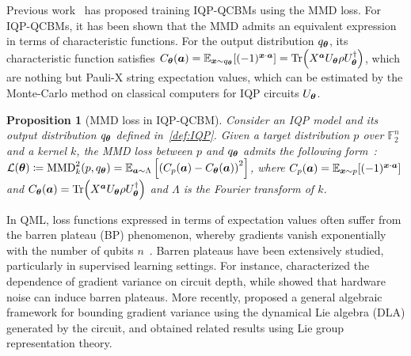 \documentclass{article}
\theoremstyle{plain}
\newtheorem{proposition}[theorem]{Proposition}
\theoremstyle{definition}
\theoremstyle{remark}
\begin{document}
Previous work~\citet{recioarmengol25} has proposed training IQP-QCBMs using the MMD loss. 
For IQP-QCBMs, it has been shown that the MMD admits an equivalent expression in terms of characteristic functions. For the output distribution $q_{\bm{\theta}}$, its characteristic function satisfies $C_{\bm{\theta}}({\bm{a}})=\operatorname*{\mathbb{E}}_{{\bm{x}} \sim q_{\bm{\theta}}}[(-1)^{{\bm{x}} \cdot {\bm{a}}}]=\Tr(X^{{\bm{a}}}U_{\bm{\theta}}\rho U_{\bm{\theta}}^\dagger)$, which are nothing but Pauli-X string expectation values, which can be estimated by the Monte-Carlo method on classical computers for IQP circuits $U_{\bm{\theta}}$.
\begin{proposition} [MMD loss in IQP-QCBM]\label{prop:mmd-loss}
Consider an IQP model and its output distribution $q_{\bm{\theta}}$ defined in~\cref{def:IQP}. Given a target distribution $p$ over $\mathbb{F}_2^n$ and a kernel $k$, the MMD loss between $p$ and $q_{\bm{\theta}}$ admits the following form~\citep{rudolph24, recioarmengol25}: $\mathcal{L}({\bm{\theta}}) \coloneqq \mathrm{MMD}^2_k(p, q_{\bm{\theta}}) = \operatorname*{\mathbb{E}}_{{\bm{a}} \sim \Lambda} \left[ \left( C_p({\bm{a}}) - C_{\bm{\theta}}({\bm{a}}) \right)^2 \right]$,
where $C_p({\bm{a}})  = \operatorname*{\mathbb{E}}_{{\bm{x}} \sim p}[(-1)^{{\bm{x}} \cdot {\bm{a}}}]$ and $C_{\bm{\theta}}({\bm{a}})=\Tr(X^{{\bm{a}}}U_{\bm{\theta}}\rho U_{\bm{\theta}}^\dagger)$ and $\Lambda$ is the Fourier transform of $k$.  
\end{proposition}
In QML, loss functions expressed in terms of expectation values often suffer from the barren plateau (BP) phenomenon, whereby gradients vanish exponentially with the number of qubits $n$~\citep{mcclean18}. Barren plateaus have been extensively studied, particularly in supervised learning settings. For instance, \citet{Cerezo21} characterized the dependence of gradient variance on circuit depth, while \citet{Wang21} showed that hardware noise can induce barren plateaus. More recently, \citet{Ragone24} proposed a general algebraic framework for bounding gradient variance using the dynamical Lie algebra (DLA) generated by the circuit, and \citet{fontana2024characterizing} obtained related results using Lie group representation theory.
\end{document}
